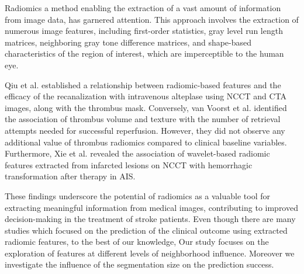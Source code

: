 \documentclass[preprint,12pt]{elsarticle}
\begin{document}
Radiomics  a method enabling the extraction of a vast amount of information from image data, has garnered attention. This approach involves the extraction of numerous image features, including first-order statistics, gray level run length matrices, neighboring gray tone difference matrices, and shape-based characteristics of the region of interest, which are imperceptible to the human eye. 


Qiu et al. \cite{Qiu2018} established a relationship between radiomic-based features and the efficacy of the recanalization with intravenous alteplase using NCCT and CTA images, along with the thrombus mask. Conversely, van Voorst et al. \cite{vanVoorst2022} identified the association of thrombus volume and texture with the number of retrieval attempts needed for successful reperfusion. However, they did not observe any additional value of thrombus radiomics compared to clinical baseline variables. Furthermore, Xie et al. \cite{Xie2022} revealed the association of wavelet-based radiomic features extracted from infarcted lesions on NCCT with hemorrhagic transformation after therapy in AIS. 

These findings underscore the potential of radiomics as a valuable tool for extracting meaningful information from medical images, contributing to improved decision-making in the treatment of stroke patients. Even though there are many studies which focused on the prediction of the clinical outcome using extracted radiomic features, to the best of our knowledge,  Our study focuses on the exploration of features at different levels of neighborhood influence. Moreover we investigate the influence of the segmentation size on the prediction success.



\end{document}

